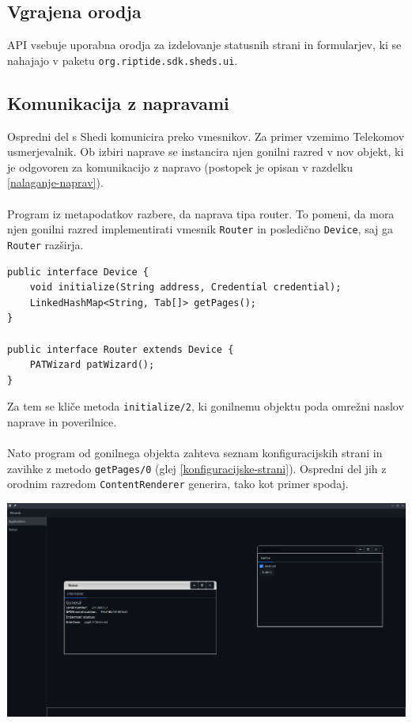 \documentclass[12pt]{article}
\begin{document}
\subsection{Vgrajena orodja}
API vsebuje uporabna orodja za izdelovanje statusnih strani in
formularjev, ki se nahajajo v paketu \texttt{org.riptide.sdk.sheds.ui}.

\subsection{Komunikacija z napravami} \label{komunikacija-z-napravami}
Ospredni del s Shedi komunicira preko vmesnikov. Za primer vzemimo
Telekomov usmerjevalnik. Ob izbiri naprave se instancira njen gonilni
razred v nov objekt, ki je odgovoren za komunikacijo z napravo
(postopek je opisan v razdelku \ref{nalaganje-naprav}).
\\\\
Program iz metapodatkov razbere, da naprava tipa router. To pomeni,
da mora njen gonilni razred implementirati vmesnik \texttt{Router} in
posledično \texttt{Device}, saj ga \texttt{Router} razširja.
\newpage

\begin{lstlisting}[style=JavaStyle]
public interface Device {
	void initialize(String address, Credential credential);
	LinkedHashMap<String, Tab[]> getPages();
}

public interface Router extends Device {
	PATWizard patWizard();
}
\end{lstlisting}
Za tem se kliče metoda \texttt{initialize/2}, ki gonilnemu objektu poda
omrežni naslov naprave in poverilnice.
\\\\
Nato program od gonilnega objekta zahteva seznam konfiguracijskih strani
in zavihke z metodo \texttt{getPages/0} (glej \ref{konfiguracijske-strani}).
Ospredni del jih z orodnim razredom \texttt{ContentRenderer} generira, tako
kot primer spodaj.

\begin{center}
	\includegraphics[scale=0.28]{slike/config-window.png}
\end{center}
\newpage
\end{document}
